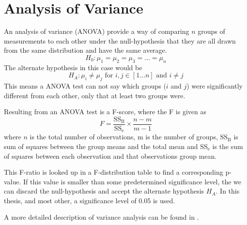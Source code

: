 \chapter{Analysis of Variance}
\label{background:ANOVA}
An analysis of variance (ANOVA) provide a way of comparing \(n\) groups of measurements to each other under the null-hypothesis that they are all drawn from the same distribution and have the same average. 
\begin{equation*}
    H_{0}: \mu_{1}=\mu_{2}=\mu_{3}=\dots=\mu_{n}
\end{equation*}
The alternate hypothesis in this case would be 
\begin{equation*}
    H_{A}: \mu_{i}\neq\mu_{j} \text{ for \(i, j \in [1 \dots n]\) and \(i \neq j\)}
\end{equation*}
This means a ANOVA test can not say which groups (\(i\) and \(j\)) were significantly different from each other, only that at least two groups were. 

Resulting from an ANOVA test is a F-score, where the F is given as
\begin{equation*}
    F=\frac{\text{SS}_{\text{B}}}{\text{SS}_{\text{e}}}
    \times
    \frac{n-m}{m-1}
\end{equation*}
where \(n\) is the total number of observations, m is the number of groups, \(\text{SS}_{\text{B}}\) is sum of squares between the group means and the total mean and \(\text{SS}_{\text{e}}\) is the sum of squares between each observation and that observations group mean. 

This F-ratio is looked up in a F-distribution table to find a corresponding p-value. If this value is smaller than some predetermined significance level, the we can discard the null-hypothesis and accept the alternate hypothesis \(H_{A}\). In this thesis, and most other, a significance level of 0.05 is used. 

A more detailed description of variance analysis can be found in \cite{anova}.